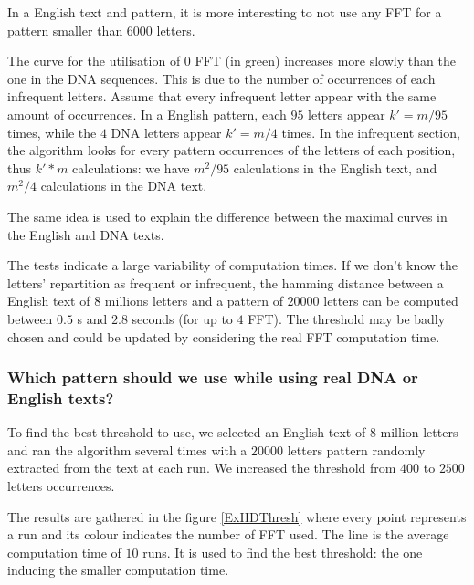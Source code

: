 \documentclass[preprint,12pt]{elsarticle}
\begin{document}
In a English text and pattern, it is more interesting to not use any FFT for a pattern smaller than $6000$ letters.

The curve for the utilisation of $0$ FFT (in green) increases more slowly than the one in the DNA sequences.
This is due to the number of occurrences of each infrequent letters.
Assume that every infrequent letter appear with the same amount of occurrences.
In a English pattern, each $95$ letters appear $k'=m/95$ times,
while the $4$ DNA letters appear $k'=m/4$ times.
In the infrequent section, the algorithm looks for every pattern occurrences of the letters of each position,
thus $k'*m$ calculations:
we have $m^2/95$ calculations in the English text,
and $m^2/4$ calculations in the DNA text. 

The same idea is used to explain the difference between the maximal curves in the English and DNA texts.


The tests indicate a large variability of computation times.
If we don't know the letters' repartition as frequent or infrequent,
the hamming distance between a English text of $8$ millions letters
and a pattern of $20 000$ letters can be computed between $0.5$ s and $2.8$ seconds
(for up to $4$ FFT).
The threshold may be badly chosen and could be updated by considering the real FFT computation time.




\subsubsection*{Which pattern should we use while using real DNA or English texts?}

To find the best threshold to use,
we selected an English text of $8$ million letters
and ran the algorithm several times
with a $20 000$ letters pattern
randomly extracted from the text at each run.
We increased the threshold from $400$ to $2500$ letters occurrences.%

The results are gathered in the figure \ref{ExHDThresh} where
every point represents a run and its colour indicates the number of FFT used.
The line is the average computation time of $10$ runs.
It is used to find the best threshold:
the one inducing the smaller computation time.
\end{document}
